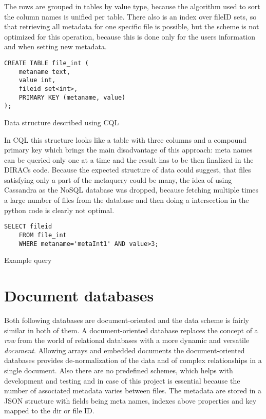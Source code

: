 The rows are grouped in tables by value type, because the algorithm used to sort the
column names is unified per table. There also is an index over fileID sets, 
so that retrieving all metadata for one specific file is possible, but the scheme is 
not optimized for this operation, because this is done only for the users information and
when setting new metadata.

\begin{listing}
\begin{verbatim}
CREATE TABLE file_int (
    metaname text,
    value int,
    fileid set<int>,
    PRIMARY KEY (metaname, value)
);
\end{verbatim}
\caption{Data structure described using CQL}
\end{listing}

In CQL this structure looks like a table with three columns and a compound primary key which
brings the main disadvantage of this approach: meta names can be queried only one at a time and
the result has to be then finalized in the DIRACs code. Because the expected structure of data could
suggest, that files satisfying only a part of the metaquery could be many, the idea of using 
Cassandra as the NoSQL database was dropped, because fetching multiple times a large number of 
files from the database and then doing a intersection in the python code is clearly not optimal. 

\begin{listing}
\begin{verbatim}
SELECT fileid 
	FROM file_int 
	WHERE metaname='metaInt1' AND value>3;
\end{verbatim}
\caption{Example query}
\end{listing}

\section{Document databases}

Both following databases are document-oriented and the data scheme is fairly similar in both
of them. A document-oriented database replaces the concept of a \textit{row} from the world of relational 
databases with a more dynamic and versatile \textit{document}. Allowing arrays and embedded documents the 
document-oriented databases provides de-normalization of the data and  of complex 
relationships in a single document. Also there are no predefined schemes, which helps with development 
and testing and in case of this project is essential because the number of associated metadata varies between 
files. The metadata are stored in a JSON structure with fields being meta names, indexes above properties and key 
mapped to the dir or file ID.

